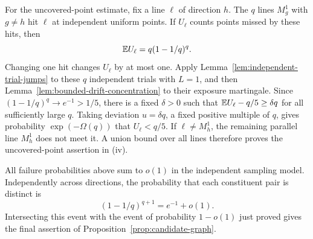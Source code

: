 For the uncovered-point estimate, fix a line $\ell$ of direction $h$.
The $q$ lines $M_g^1$ with $g\ne h$ hit $\ell$ at independent
uniform points. If $U_\ell$ counts points missed by these hits, then
\[
 \mathbb E U_\ell=q(1-1/q)^q.
\]
Changing one hit changes $U_\ell$ by at most one. Apply
Lemma~\ref{lem:independent-trial-jumps} to these $q$ independent trials
with $L=1$, and then Lemma~\ref{lem:bounded-drift-concentration} to
their exposure martingale. Since $(1-1/q)^q\to e^{-1}>1/5$, there is
a fixed $\delta>0$ such that $\mathbb E U_\ell-q/5\ge\delta q$ for all
sufficiently large $q$. Taking deviation $u=\delta q$, a fixed positive
multiple of $q$, gives probability $\exp(-\Omega(q))$ that
$U_\ell<q/5$. If $\ell\ne M_h^1$, the remaining parallel line
$M_h^1$ does not meet it. A union bound over all lines therefore proves
the uncovered-point assertion in (iv).

All failure probabilities above sum to $o(1)$ in the independent
sampling model. Independently across directions, the probability that
each constituent pair is distinct is
\[
 (1-1/q)^{q+1}=e^{-1}+o(1).
\]
Intersecting this event with the event of probability $1-o(1)$ just
proved gives the final assertion of
Proposition~\ref{prop:candidate-graph}.

